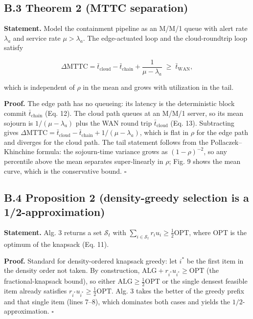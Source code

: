 \documentclass[cmc,article,submit,moreauthors,pdftex]{Definitions/tsp}
\begin{document}
\subsection*{B.3 Theorem 2 (MTTC separation)}

\textbf{Statement.} Model the containment pipeline as an M/M/1 queue with alert rate $\lambda_a$ and service rate $\mu > \lambda_a$. The edge-actuated loop and the cloud-roundtrip loop satisfy

\[
\Delta\mathrm{MTTC} = \bar{t}_{\mathrm{cloud}} - \bar{t}_{\mathrm{chain}} + \frac{1}{\mu-\lambda_a} \;\ge\; \bar{t}_{\mathrm{WAN}},
\]

which is independent of $\rho$ in the mean and grows with utilization in the tail.

\textbf{Proof.} The edge path has no queueing: its latency is the deterministic block commit $\bar{t}_{\mathrm{chain}}$ (Eq. 12). The cloud path queues at an M/M/1 server, so its mean sojourn is $1/(\mu-\lambda_a)$ plus the WAN round trip $\bar{t}_{\mathrm{cloud}}$ (Eq. 13). Subtracting gives $\Delta\mathrm{MTTC} = \bar{t}_{\mathrm{cloud}} - \bar{t}_{\mathrm{chain}} + 1/(\mu-\lambda_a)$, which is flat in $\rho$ for the edge path and diverges for the cloud path. The tail statement follows from the Pollaczek--Khinchine formula: the sojourn-time variance grows as $(1-\rho)^{-2}$, so any percentile above the mean separates super-linearly in $\rho$; Fig. 9 shows the mean curve, which is the conservative bound. $\square$

\subsection*{B.4 Proposition 2 (density-greedy selection is a 1/2-approximation)}

\textbf{Statement.} Alg. 3 returns a set $\mathcal{S}_t$ with $\sum_{i \in \mathcal{S}_t} r_i u_i \ge \tfrac{1}{2} \mathrm{OPT}$, where OPT is the optimum of the knapsack (Eq. 11).

\textbf{Proof.} Standard for density-ordered knapsack greedy: let $i^*$ be the first item in the density order not taken. By construction, $\mathrm{ALG} + r_{i^*}u_{i^*} \ge \mathrm{OPT}$ (the fractional-knapsack bound), so either $\mathrm{ALG} \ge \tfrac{1}{2}\mathrm{OPT}$ or the single densest feasible item already satisfies $r_{i^*}u_{i^*} \ge \tfrac{1}{2}\mathrm{OPT}$. Alg. 3 takes the better of the greedy prefix and that single item (lines 7--8), which dominates both cases and yields the $1/2$-approximation. $\square$
\end{document}
